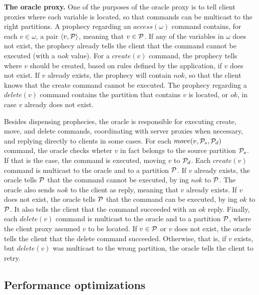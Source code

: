 \textbf{The oracle proxy.} One of the purposes of the oracle proxy is to tell client proxies where each variable is located, so that commands can be multicast to the right partitions.
A prophecy regarding an $access(\omega)$ command contains, for each $v \in \omega$, a pair $\langle v, \mathcal{P} \rangle$, meaning that $v \in \mathcal{P}$.
If any of the variables in $\omega$ does not exist, the prophecy already tells the client that the command cannot be executed (with a $nok$ value).
For a $create(v)$ command, the prophecy tells where $v$ should be created, based on rules defined by the application, if $v$ does not exist.
If $v$ already exists, the prophecy will contain $nok$, so that the client knows that the create command cannot be executed.
The prophecy regarding a $delete(v)$ command contains the partition that contains $v$ is located, or $ok$, in case $v$ already does not exist.

Besides dispensing prophecies, the oracle is responsible for executing create, move, and delete commands, coordinating with server proxies when necessary, and replying directly to clients in some cases.
For each $move(v,\mathcal{P}_s,\mathcal{P}_d)$ command, the oracle checks wheter $v$ in fact belongs to the source partition $\mathcal{P}_s$.
If that is the case, the command is executed, moving $v$ to $\mathcal{P}_d$.
Each $create(v)$ command is multicast to the oracle and to a partition $\mathcal{P}$.
If $v$ already exists, the oracle tells $\mathcal{P}$ that the command cannot be executed, by \rmcast{}ing $nok$ to $\mathcal{P}$.
The oracle also sends $nok$ to the client as reply, meaning that $v$ already exists.
If $v$ does not exist, the oracle tells $\mathcal{P}$ that the command can be executed, by \rmcast{}ing $ok$ to $\mathcal{P}$.
It also tells the client that the command succeeded with an $ok$ reply.
Finally, each $delete(v)$ command is multicast to the oracle and to a partition $\mathcal{P}$, where the client proxy assumed $v$ to be located.
If $v \in \mathcal{P}$ or $v$ does not exist, the oracle tells the client that the delete command succeeded.
Otherwise, that is, if $v$ exists, but $delete(v)$ was multicast to the wrong partition, the oracle tells the client to retry.



\subsection{Performance optimizations}
\label{sec:optm}


